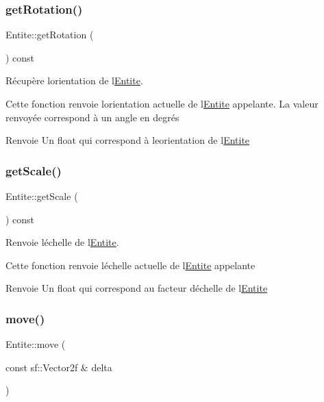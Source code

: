 \subsubsection{\texorpdfstring{get\+Rotation()}{getRotation()}}
{\footnotesize\ttfamily Entite\+::get\+Rotation (\begin{DoxyParamCaption}{ }\end{DoxyParamCaption}) const}



Récupère l\textquotesingle{}orientation de l\textquotesingle{}\hyperlink{class_entite}{Entite}. 

Cette fonction renvoie l\textquotesingle{}orientation actuelle de l\textquotesingle{}\hyperlink{class_entite}{Entite} appelante. La valeur renvoyée correspond à un angle en degrés \begin{DoxyReturn}{Renvoie}
Un {\ttfamily float} qui correspond à l\textquotesingle{}eorientation de l\textquotesingle{}\hyperlink{class_entite}{Entite} 
\end{DoxyReturn}
\mbox{\label{class_entite_a5f70868f62049291edf4b245a531a6e0}} 
\subsubsection{\texorpdfstring{get\+Scale()}{getScale()}}
{\footnotesize\ttfamily Entite\+::get\+Scale (\begin{DoxyParamCaption}{ }\end{DoxyParamCaption}) const}



Renvoie l\textquotesingle{}échelle de l\textquotesingle{}\hyperlink{class_entite}{Entite}. 

Cette fonction renvoie l\textquotesingle{}échelle actuelle de l\textquotesingle{}\hyperlink{class_entite}{Entite} appelante \begin{DoxyReturn}{Renvoie}
Un {\ttfamily float} qui correspond au facteur d\textquotesingle{}échelle de l\textquotesingle{}\hyperlink{class_entite}{Entite} 
\end{DoxyReturn}
\mbox{\label{class_entite_ac409613f3cf67cae14babd4b16811c8f}} 
\subsubsection{\texorpdfstring{move()}{move()}}
{\footnotesize\ttfamily Entite\+::move (\begin{DoxyParamCaption}\item[{const sf\+::\+Vector2f \&}]{delta }\end{DoxyParamCaption})}



